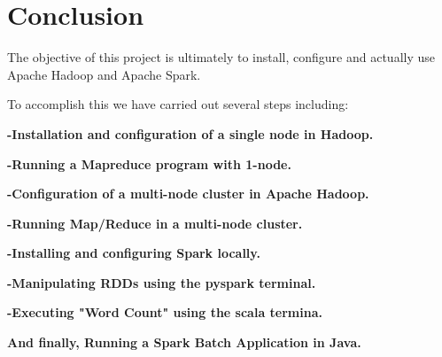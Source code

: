 \chapter*{Conclusion}
\vspace{2cm}
\par \Large The objective of this project is ultimately to install, configure and actually use Apache Hadoop and Apache Spark. \\
\par \Large To accomplish this we have carried out several steps including: 

\begin{flushleft} \large
{
\item \textbf{-Installation and configuration of a single node in Hadoop.} \\[0.7cm]
\item \textbf{-Running a Mapreduce program with 1-node.}\\[0.7cm]
\item \textbf{-Configuration of a multi-node cluster in Apache Hadoop.}\\[0.7cm]
\item \textbf{-Running Map/Reduce in a multi-node cluster.}\\[0.7cm]
\item \textbf{-Installing and configuring Spark locally.}\\[0.7cm]
\item \textbf{-Manipulating RDDs using the pyspark terminal.}\\[0.7cm]
\item \textbf{-Executing "Word Count" using the scala termina.}\\[0.7cm]
\item \textbf{And finally, Running a Spark Batch Application in Java.}\\[0.7cm]
\item
}
\end{flushleft}


\newpage